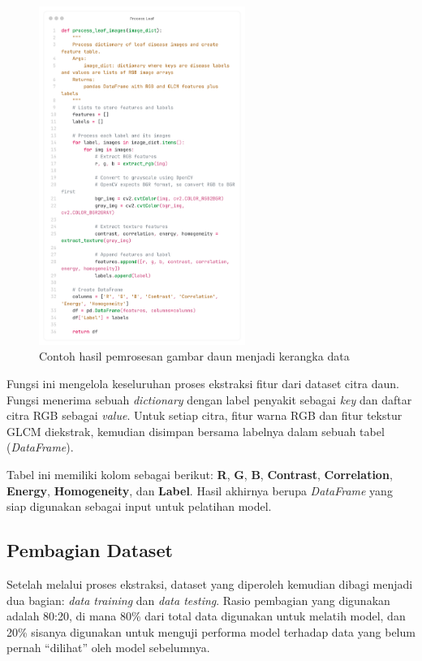 \begin{figure}[H]
  \centering
  \includegraphics[width=0.6\textwidth]{figure/chapter-4-process_leaf.png}
  \caption{Contoh hasil pemrosesan gambar daun menjadi kerangka data}
  \label{fig:extract_rgb}
\end{figure}

Fungsi ini mengelola keseluruhan proses ekstraksi fitur dari dataset citra daun. Fungsi menerima sebuah \textit{dictionary} dengan label penyakit sebagai \textit{key} dan daftar citra RGB sebagai \textit{value}. Untuk setiap citra, fitur warna RGB dan fitur tekstur GLCM diekstrak, kemudian disimpan bersama labelnya dalam sebuah tabel (\textit{DataFrame}). 

Tabel ini memiliki kolom sebagai berikut: \textbf{R}, \textbf{G}, \textbf{B}, \textbf{Contrast}, \textbf{Correlation}, \textbf{Energy}, \textbf{Homogeneity}, dan \textbf{Label}. Hasil akhirnya berupa \textit{DataFrame} yang siap digunakan sebagai input untuk pelatihan model.

\subsection{Pembagian Dataset} \label{IV.Pembagian Dataset}

Setelah melalui proses ekstraksi, dataset yang diperoleh kemudian dibagi menjadi dua bagian: \textit{data training} dan \textit{data testing}. Rasio pembagian yang digunakan adalah 80:20, di mana 80\% dari total data digunakan untuk melatih model, dan 20\% sisanya digunakan untuk menguji performa model terhadap data yang belum pernah ``dilihat'' oleh model sebelumnya.

